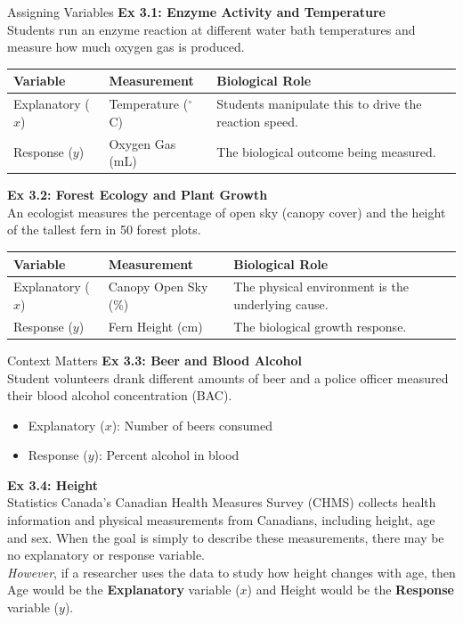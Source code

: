 \documentclass[aspectratio=169]{beamer}
\begin{document}
\begin{frame}{Assigning Variables}
 \textbf{Ex 3.1: Enzyme Activity and Temperature} \\
 Students run an enzyme reaction at different water bath temperatures and measure how much oxygen gas is produced.
 \begin{table}
 \centering
\scriptsize
\begin{tabular}{lll}
\toprule
\textbf{Variable} & \textbf{Measurement} & \textbf{Biological Role} \\
\midrule
Explanatory ($x$) & Temperature ($^\circ$C) & Students manipulate this to drive the reaction speed. \\
Response ($y$) & Oxygen Gas (mL) & The biological outcome being measured. \\
\bottomrule
\end{tabular}
\end{table}
\vspace{0.2cm}
\textbf{Ex 3.2: Forest Ecology and Plant Growth} \\
An ecologist measures the percentage of open sky (canopy cover) and the height of the tallest fern in 50 forest plots.
\begin{table}
 \centering
\scriptsize
\begin{tabular}{lll}
\toprule
\textbf{Variable} & \textbf{Measurement} & \textbf{Biological Role} \\
\midrule
Explanatory ($x$) & Canopy Open Sky (\%) & The physical environment is the underlying cause. \\
Response ($y$) & Fern Height (cm) & The biological growth response. \\
\bottomrule
 \end{tabular}
 \end{table}
\end{frame}

\begin{frame}{Context Matters}
  \textbf{Ex 3.3: Beer and Blood Alcohol} \\
  Student volunteers drank different amounts of beer and a police officer measured their blood alcohol concentration (BAC). 
  \begin{itemize}
      \item Explanatory ($x$): Number of beers consumed
      \item Response ($y$): Percent alcohol in blood
  \end{itemize}
  \vspace{0.3cm}
  \textbf{Ex 3.4: Height} \\
	Statistics Canada's Canadian Health Measures Survey (CHMS) collects health information and physical measurements from Canadians, including height, age and sex. When the goal is simply to describe these measurements, there may be no explanatory or response variable. \\
	\emph{However}, if a researcher uses the data to study how height changes with age, then Age would be the \textbf{Explanatory} variable ($x$) and Height would be the \textbf{Response} variable ($y$).
\end{frame}
\end{document}
